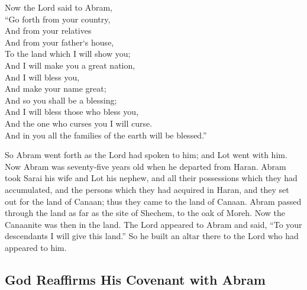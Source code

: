 \begin{scripture}[Genesis 12:1-7]
    \noindent{}Now the Lord said to Abram,\\
    “Go forth from your country,\\
    And from your relatives\\
    And from your father`s house,\\
    To the land which I will show you;\\
    And I will make you a great nation,\\
    And I will bless you,\\
    And make your name great;\\
    And so you shall be a blessing;\\
    And I will bless those who bless you,\\
    And the one who curses you I will curse.\\
    And in you all the families of the earth will be blessed.”\\

    \vspace{1\baselineskip}

    So Abram went forth as the 
    Lord had spoken to him; and Lot went with him. Now Abram was seventy-five years old when he departed from Haran.
    Abram took Sarai his wife and Lot his nephew, and all their possessions which they had accumulated, and the persons which they had acquired in Haran, and they set out for the land of Canaan; thus they came to the land of Canaan.
    Abram passed through the land as far as the site of Shechem, to the oak of Moreh. Now the Canaanite was then in the land. 
    The Lord appeared to Abram and said, “To your descendants I will give this land.” So he built an altar there to the Lord who had appeared to him.
\end{scripture}

\pagebreak
\subsection{God Reaffirms His Covenant with Abram}

